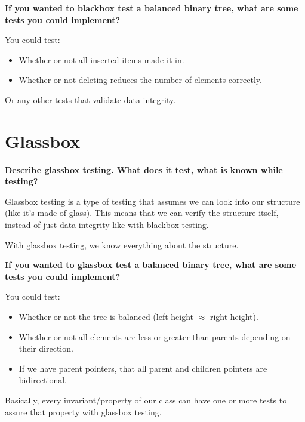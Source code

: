 \documentclass[12pt, letterpaper]{article}
\newcommand{\question}[1]{\textbf{#1}\par}
\newenvironment{answerblock}{\color{Green4}}{\normalcolor\vspace{1em}}
\begin{document}
\question{If you wanted to blackbox test a balanced binary tree, what are some
tests you could implement?}

\begin{answerblock}
You could test:

\begin{itemize}
    \item Whether or not all inserted items made it in.
    \item Whether or not deleting reduces the number of elements correctly.
\end{itemize}

Or any other tests that validate data integrity.
\end{answerblock}

\pagebreak
\section{Glassbox}

\question{Describe glassbox testing. What does it test, what is known while
testing?}

\begin{answerblock}
Glassbox testing is a type of testing that assumes we can look into our
structure (like it's made of glass). This means that we can verify the
structure itself, instead of just data integrity like with blackbox testing.

With glassbox testing, we know everything about the structure.
\end{answerblock}

\question{If you wanted to glassbox test a balanced binary tree, what are some
tests you could implement?}

\begin{answerblock}
You could test:

\begin{itemize}
    \item Whether or not the tree is balanced (left height \(\approx\) right height).
    \item Whether or not all elements are less or greater than parents
    depending on their direction.
    \item If we have parent pointers, that all parent and children pointers are
    bidirectional.
\end{itemize}

Basically, every invariant/property of our class can have one or more tests to
assure that property with glassbox testing.
\end{answerblock}
\end{document}
